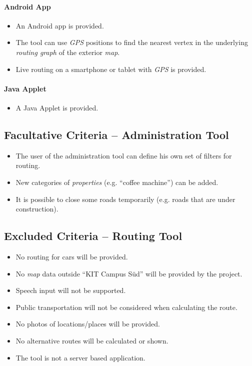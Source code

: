 \paragraph{Android App}
\begin{itemize}
	\item An Android app is provided.
	\item The tool can use \textit{GPS} positions to find the nearest vertex in the underlying \textit{routing graph} of the exterior \textit{map}.
	\item Live routing on a smartphone or tablet with \textit{GPS} is provided.
\end{itemize}

\paragraph{Java Applet}
\begin{itemize}
	\item A Java Applet is provided.
\end{itemize}

\subsection{Facultative Criteria -- Administration Tool}

\begin{itemize}
	\item The user of the administration tool can define his own set of filters for routing.
	\item New categories of \textit{properties} (e.g. ``coffee machine'') can be added.
	\item It is possible to close some roads temporarily (e.g. roads that are under construction).
\end{itemize}

\subsection{Excluded Criteria -- Routing Tool}

\begin{itemize}
	\item No routing for cars will be provided.
	\item No \textit{map} data outside ``KIT Campus Süd'' will be provided by the project.
	\item Speech input will not be supported.
	\item Public transportation will not be considered when calculating the route.
	\item No photos of locations/places will be provided.
	\item No alternative routes will be calculated or shown.
	\item The tool is not a server based application.
\end{itemize}

